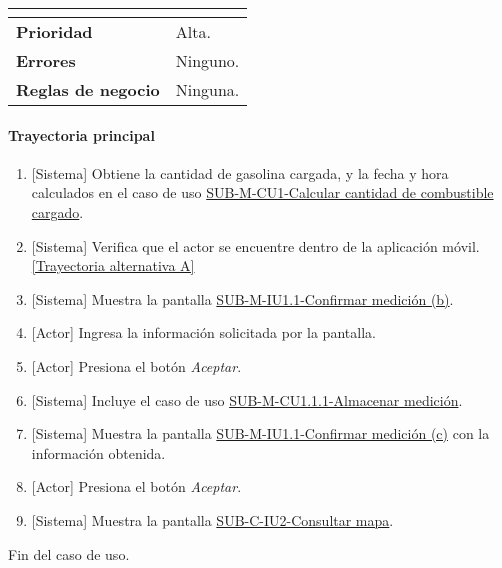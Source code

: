 \begin{longtable}{|J{5cm}|J{10.3cm}|}
\begin{itemize}
		\end{itemize} \\ \hline 
	\textbf{Prioridad} & 
		Alta. \\ \hline
	\textbf{Errores} & Ninguno.
		\\ \hline
	\textbf{Reglas de negocio} & Ninguna.
		 \\ \hline
\end{longtable}

\paragraph{Trayectoria principal}
	\begin{enumerate}
		\item {[Sistema]} Obtiene la cantidad de gasolina cargada, y la fecha y hora calculados en el caso de uso \hyperref[SUB-M-CU1]{SUB-M-CU1-Calcular cantidad de combustible cargado}.
		\item {[Sistema]} Verifica que el actor se encuentre dentro de la aplicación móvil.\hyperref[SUB-M-CU1.1:TA]{[Trayectoria alternativa A]}
		\item \label{SUB-M-CU1.1:Pantalla} {[Sistema]} Muestra la pantalla \hyperref[fig:sub-m-iu1.1.b]{SUB-M-IU1.1-Confirmar medición (b)}.
		\item {[Actor]} Ingresa la información solicitada por la pantalla.
		\item \label{SUB-M-CU1.1:Boton} {[Actor]} Presiona el botón \textit{Aceptar}.
		\item {[Sistema]} Incluye el caso de uso \hyperref[SUB-M-CU1.1.1]{SUB-M-CU1.1.1-Almacenar medición}.
		\item \label{SUB-M-CU1.1:PantallaFinal} {[Sistema]} Muestra la pantalla \hyperref[fig:sub-m-iu1.1.c]{SUB-M-IU1.1-Confirmar medición (c)} con la información obtenida.
		\item {[Actor]} Presiona el botón \textit{Aceptar}.
		\item {[Sistema]} Muestra la pantalla \hyperref[fig:sub-c-iu2]{SUB-C-IU2-Consultar mapa}.
	\end{enumerate}
	Fin del caso de uso.

